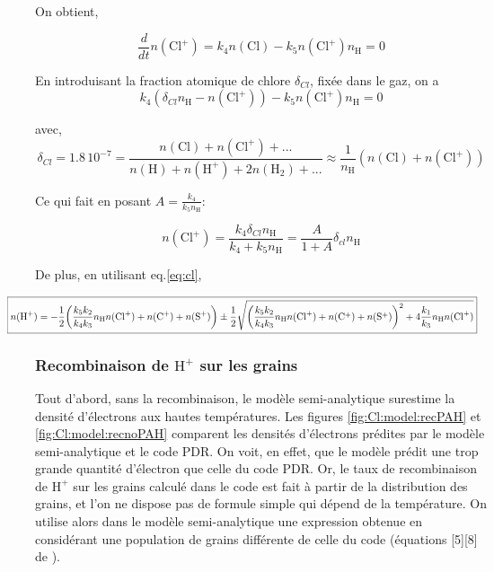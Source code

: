On obtient,

\begin{equation}
     \frac{d}{dt}n(\mathrm{Cl}^+) = k_4 n(\mathrm{Cl}) - k_5 n(\mathrm{Cl}^+) n_{\mathrm{H}} = 0
     \label{eq:cl}
\end{equation}


En introduisant la fraction atomique de chlore $\delta_{Cl}$, fixée dans le gaz, on a 
\begin{equation}
    k_4(\delta_{Cl}n_{\mathrm{H}} - n(\mathrm{Cl}^+)) - k_5 n(\mathrm{Cl}^+) n_{\mathrm{H}} = 0
\end{equation}

 avec,
\begin{equation}
    \delta_{Cl} = 1.8\,10^{-7} = \frac{n(\mathrm{Cl}) + n(\mathrm{Cl}^+) + ...}{n(\mathrm{H}) + n(\mathrm{H}^+) + 2n(\mathrm{H}_2) + ...} \approx \frac{1}{n_{\mathrm{H}}} (n(\mathrm{Cl}) + n(\mathrm{Cl}^+) )
\end{equation}

Ce qui fait en posant $A = \frac{k_4}{k_5 n_{\mathrm{H}}}$:

\begin{equation}
\boxed{n(\mathrm{Cl}^+) = \frac{k_4 \delta_{Cl} n_{\mathrm{H}}}{k_4 + k_5 n_{\mathrm{H}}} = \frac{A}{1 + A} \delta_{cl} n_{\mathrm{H}}}
\end{equation}

De plus, en utilisant eq.\ref{eq:cl},

\begin{equation}
\hspace{-3em}
\resizebox{1.1\hsize}{!}{
    \boxed{n(\mathrm{H}^+) = -\frac{1}{2} \bigg( \frac{k_5 k_2}{k_4 k_3} n_{\mathrm{H}} n(\mathrm{Cl}^+) + n(\mathrm{C}^+)+ n(\mathrm{S}^+) \bigg) \pm \frac{1}{2} \sqrt{\bigg( \frac{k_5 k_2}{k_4 k_3} n_{\mathrm{H}} n(\mathrm{Cl}^+) + n(\mathrm{C}^+)+ n(\mathrm{S}^+) \bigg)^2 + 4\frac{k_1}{k_3}n_{\mathrm{H}} n(\mathrm{Cl}^+)}}
    }
\end{equation}



\subsubsection{Recombinaison de $\mathrm{H}^+$ sur les grains}

Tout d'abord, sans la recombinaison, le modèle semi-analytique surestime la densité d'électrons aux hautes températures. Les figures \ref{fig:Cl:model:recPAH} et \ref{fig:Cl:model:recnoPAH} comparent les densités d'électrons prédites par le modèle semi-analytique et le code PDR. On voit, en effet, que le modèle prédit une trop grande quantité d'électron que celle du code PDR. Or, le taux de recombinaison de $\mathrm{H}^+$ sur les grains calculé dans le code est fait à partir de la distribution des grains, et l'on ne dispose pas de formule simple qui dépend de la température. On utilise alors dans le modèle semi-analytique une expression obtenue en considérant une population de grains différente de celle du code (équations [5][8] de \cite{Weingartner_2001}). 


